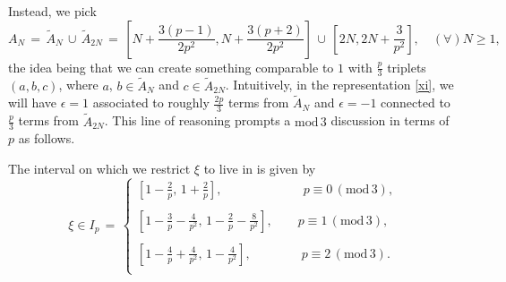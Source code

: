 \documentclass{amsart}
\begin{document}
Instead, we pick
\[
A_N\,=\,\tilde{A}_N\,\cup\,\tilde{A}_{2N}\,=\,\left[N+\frac{3(p-1)}{2p^2},N+\frac{3(p+2)}{2p^2}\right]\,\cup\, \left[2N, 2N+\frac{3}{p^2}\right], \quad (\forall) N \geq 1,
\]
the idea being that we can create something comparable to $1$ with $\frac p3$ triplets $(a,b,c)$, where $a$, $b \in \tilde{A}_N$ and $c \in \tilde{A}_{2N}$. Intuitively, in the representation \eqref{xi}, we will have $\epsilon=1$ associated to roughly $\frac{2p}{3}$ terms from $\tilde{A}_N$ and  $\epsilon=-1$ connected to $\frac p3$ terms from $\tilde{A}_{2N}$. This line of reasoning prompts a $\text{mod}\,3$ discussion in terms of $p$ as follows.

The interval on which we restrict $\xi$ to live in is given by
\begin{equation}
\xi \in I_p\,=\, \left\{
\begin{array}{l}
\left[1-\frac{2}{p}, \,1+\frac{2}{p}\right],  \qquad \qquad \qquad \ \ p\equiv 0\, (\text{mod}\,3),\\
\\
\left[1-\frac{3}{p}-\frac{4}{p^2}, \, 1-\frac{2}{p}-\frac{8}{p^2}\right], \qquad  p\equiv 1\,(\text{mod}\,3),\\
\\
\left[1-\frac{4}{p}+\frac{4}{p^2}, \,1-\frac{4}{p^2}\right], \qquad  \qquad p\equiv 2\,(\text{mod}\,3).\\
\end{array}\right.
\end{equation}
\end{document}

